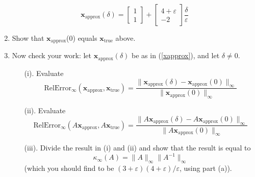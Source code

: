 \documentclass{article}
\newcommand{\ep}{{\varepsilon}}
\begin{document}
\begin{enumerate}
\begin{equation}
			\mathbf{x}_{\text{approx}}(\delta)
			= \begin{bmatrix} 1 \\ 1 \end{bmatrix}
			+ \begin{bmatrix} 4 + \ep \\ -2 \end{bmatrix} \frac{\delta}{\ep}
		\end{equation}
	\item Show that $\mathbf{x}_{\text{approx}}$(0) equals $\mathbf{x}_{\text{true}}$ above.
	\item Now check your work: let $\mathbf{x}_{\text{approx}}(\delta)$
		be as in (\ref{xapprox}), and let $\delta \neq 0$.
		\begin{enumerate}
			\item[(i).] Evaluate
				\[
					\mathrm{RelError}_\infty(\mathbf{x}_{\text{approx}},\mathbf{x}_{\text{true}})
					= \frac{\lVert \mathbf{x}_{\text{approx}}(\delta)
					- \mathbf{x}_{\text{approx}}(0)\rVert_\infty}
					{\lVert \mathbf{x}_{\text{approx}}(0)\rVert_\infty}
				\]
			\item[(ii).] Evaluate
				\[
					\mathrm{RelError}_\infty(A\mathbf{x}_{\text{approx}},A\mathbf{x}_{\text{true}})
					= \frac{\lVert A\mathbf{x}_{\text{approx}}(\delta)
					- A\mathbf{x}_{\text{approx}}(0)\rVert_\infty}
					{\lVert A\mathbf{x}_{\text{approx}}(0)\rVert_\infty}
				\]
			\item[(iii).] Divide the result in (i) and (ii) and show that the result is equal to
				\[
					\kappa_\infty(A) = \lVert A \rVert_\infty \lVert A^{-1} \rVert_\infty
				\]
				(which you should find to be $(3+\ep)(4+\ep)/\ep$, using part (a)).
		\end{enumerate}
\end{enumerate}
\end{document}
